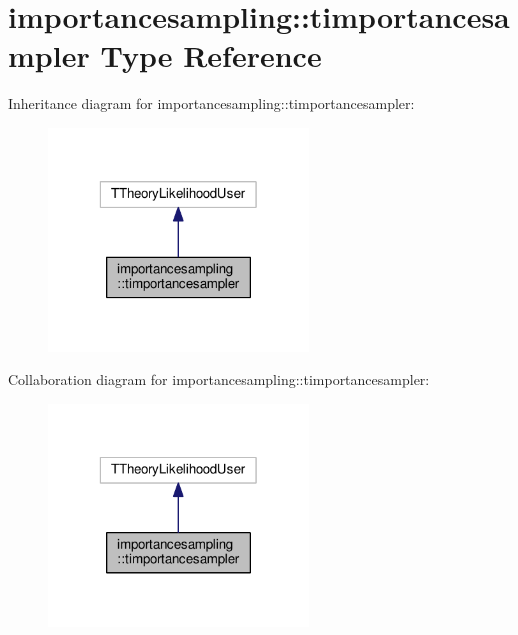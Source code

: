 \hypertarget{structimportancesampling_1_1timportancesampler}{}\section{importancesampling\+:\+:timportancesampler Type Reference}
\label{structimportancesampling_1_1timportancesampler}


Inheritance diagram for importancesampling\+:\+:timportancesampler\+:
\nopagebreak
\begin{figure}[H]
\begin{center}
\leavevmode
\includegraphics[width=196pt]{structimportancesampling_1_1timportancesampler__inherit__graph}
\end{center}
\end{figure}


Collaboration diagram for importancesampling\+:\+:timportancesampler\+:
\nopagebreak
\begin{figure}[H]
\begin{center}
\leavevmode
\includegraphics[width=196pt]{structimportancesampling_1_1timportancesampler__coll__graph}
\end{center}
\end{figure}
